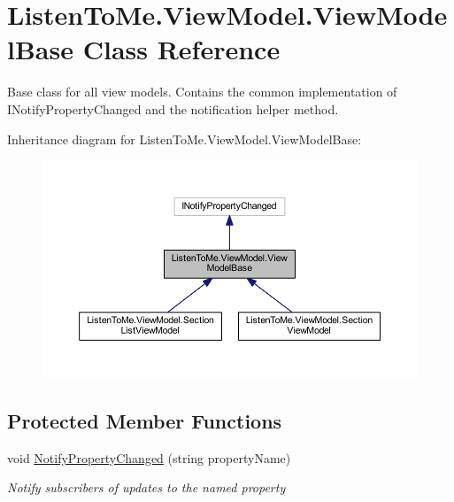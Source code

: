 \hypertarget{class_listen_to_me_1_1_view_model_1_1_view_model_base}{}\section{Listen\+To\+Me.\+View\+Model.\+View\+Model\+Base Class Reference}
\label{class_listen_to_me_1_1_view_model_1_1_view_model_base}


Base class for all view models. Contains the common implementation of I\+Notify\+Property\+Changed and the notification helper method.  




Inheritance diagram for Listen\+To\+Me.\+View\+Model.\+View\+Model\+Base\+:\nopagebreak
\begin{figure}[H]
\begin{center}
\leavevmode
\includegraphics[width=350pt]{class_listen_to_me_1_1_view_model_1_1_view_model_base__inherit__graph}
\end{center}
\end{figure}
\subsection*{Protected Member Functions}
\begin{DoxyCompactItemize}
\item 
void \hyperlink{class_listen_to_me_1_1_view_model_1_1_view_model_base_a6b89260bf9d20007189f49a73dec334d}{Notify\+Property\+Changed} (string property\+Name)
\begin{DoxyCompactList}\small\item\em Notify subscribers of updates to the named property \end{DoxyCompactList}\end{DoxyCompactItemize}
